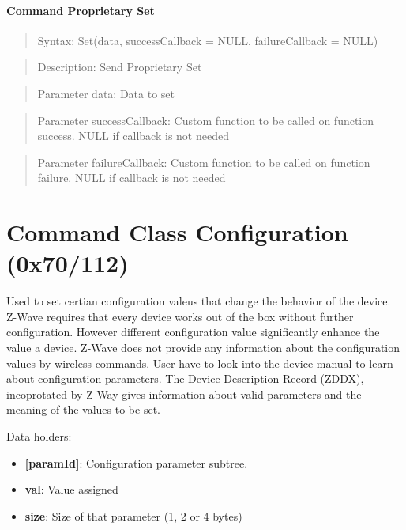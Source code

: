 \paragraph{Command Proprietary Set}
\begin{quote}Syntax: Set(data, successCallback = NULL, failureCallback = NULL)\end{quote}
\begin{quote}Description: Send Proprietary Set\end{quote}
\begin{quote}Parameter data: Data to set\end{quote}
\begin{quote}Parameter successCallback: Custom function to be called on function success. NULL if callback is not needed\end{quote}
\begin{quote}Parameter failureCallback: Custom function to be called on function failure. NULL if callback is not needed\end{quote}



\section{Command Class Configuration (0x70/112)}

Used to set certian configuration valeus that change the behavior of the device. Z-Wave requires that every device works out of the box without further configuration. However different configuration value significantly enhance the value a device. Z-Wave does not provide any information about the configuration values by wireless commands. User have to look into the device manual to learn about configuration parameters. The Device Description Record (ZDDX), incoprotated by Z-Way gives information about valid parameters and the meaning of the values to be set.
\newline

\noindent
Data holders:

\begin{itemize}
\item \textbf{[paramId]}: Configuration parameter subtree.
\item \qquad\textbf{val}: Value assigned
\item \qquad\textbf{size}: Size of that parameter (1, 2 or 4 bytes)
\end{itemize}

